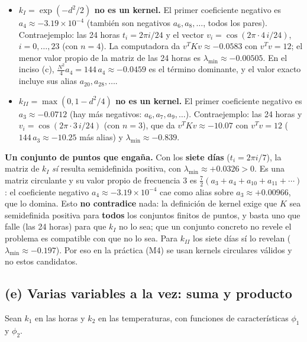 \begin{itemize}
\item \textbf{$k_I=\exp(-d^2/2)$ \textbf{no} es un kernel.} El primer
coeficiente negativo es $a_4\approx-3.19\times10^{-4}$ (también son negativos
$a_6,a_8,\dots$, todos los pares). Contraejemplo: las 24 horas
$t_i=2\pi i/24$ y el vector $v_i=\cos(2\pi\cdot4\,i/24)$, $i=0,\dots,23$ (con
$n=4$). La computadora da $v^{T}Kv\approx-0.0583$ con $v^{T}v=12$; el menor
valor propio de la matriz de las 24 horas es $\lambda_{\min}\approx-0.00505$.
En el inciso (c), $\frac{N^2}{4}a_4=144\,a_4\approx-0.0459$ es el término
dominante, y el valor exacto incluye sus alias $a_{20},a_{28},\dots$.

\item \textbf{$k_{II}=\max(0,1-d^2/4)$ \textbf{no} es un kernel.} El primer
coeficiente negativo es $a_3\approx-0.0712$ (hay más negativos: $a_6,a_7,a_9,\dots$).
Contraejemplo: las 24 horas y $v_i=\cos(2\pi\cdot3\,i/24)$ (con $n=3$), que da
$v^{T}Kv\approx-10.07$ con $v^{T}v=12$ ($144\,a_3\approx-10.25$ más alias) y
$\lambda_{\min}\approx-0.839$.
\end{itemize}

\textbf{Un conjunto de puntos que engaña.} Con los \textbf{siete días}
($t_i=2\pi i/7$), la matriz de $k_I$ \emph{sí} resulta semidefinida positiva,
con $\lambda_{\min}\approx+0.0326>0$. Es una matriz circulante y su valor
propio de frecuencia $3$ es $\frac{7}{2}(a_3+a_4+a_{10}+a_{11}+\cdots)$: el
coeficiente negativo $a_4\approx-3.19\times10^{-4}$ cae como alias sobre
$a_3\approx+0.00966$, que lo domina. Esto \textbf{no contradice} nada: la
definición de kernel exige que $K$ sea semidefinida positiva para
\textbf{todos} los conjuntos finitos de puntos, y basta uno que falle (las 24
horas) para que $k_I$ no lo sea; que un conjunto concreto no revele el
problema es compatible con que no lo sea. Para $k_{II}$ los siete días sí lo
revelan ($\lambda_{\min}\approx-0.197$). Por eso en la práctica (M4) se usan
kernels circulares válidos y no estos candidatos.

\subsection*{(e) Varias variables a la vez: suma y producto}

Sean $k_1$ en las horas y $k_2$ en las temperaturas, con funciones de
características $\phi_1$ y $\phi_2$.

